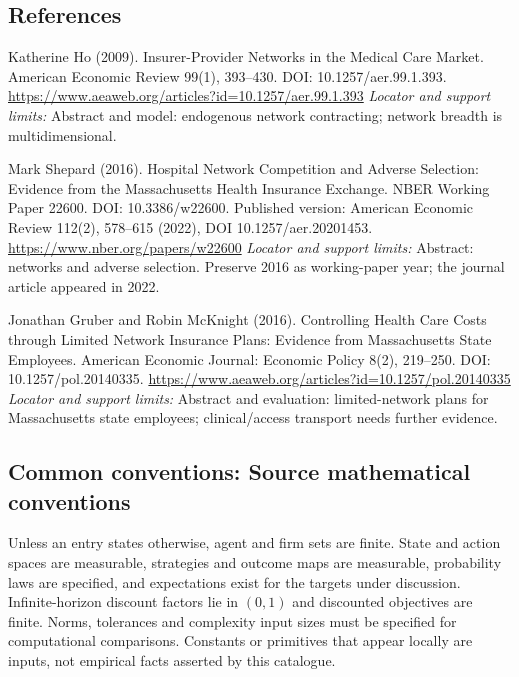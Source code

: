 \documentclass[11pt,a4paper]{article}
\begin{document}
\subsection*{References}
\begin{enumerate}[label={[S\arabic*]},leftmargin=*,itemsep=0.6em]
\item Katherine Ho (2009). Insurer-Provider Networks in the Medical Care Market. American Economic Review 99(1), 393--430. DOI: 10.1257/aer.99.1.393.
\url{https://www.aeaweb.org/articles?id=10.1257/aer.99.1.393}
\newline\emph{Locator and support limits:} Abstract and model: endogenous network contracting; network breadth is multidimensional.
\item Mark Shepard (2016). Hospital Network Competition and Adverse Selection: Evidence from the Massachusetts Health Insurance Exchange. NBER Working Paper 22600. DOI: 10.3386/w22600. Published version: American Economic Review 112(2), 578--615 (2022), DOI 10.1257/aer.20201453.
\url{https://www.nber.org/papers/w22600}
\newline\emph{Locator and support limits:} Abstract: networks and adverse selection. Preserve 2016 as working-paper year; the journal article appeared in 2022.
\item Jonathan Gruber and Robin McKnight (2016). Controlling Health Care Costs through Limited Network Insurance Plans: Evidence from Massachusetts State Employees. American Economic Journal: Economic Policy 8(2), 219--250. DOI: 10.1257/pol.20140335.
\url{https://www.aeaweb.org/articles?id=10.1257/pol.20140335}
\newline\emph{Locator and support limits:} Abstract and evaluation: limited-network plans for Massachusetts state employees; clinical/access transport needs further evidence.
\end{enumerate}

\subsection*{Common conventions: Source mathematical conventions}

Unless an entry states otherwise, agent and firm sets are finite. State and action spaces are measurable, strategies and outcome maps are measurable, probability laws are specified, and expectations exist for the targets under discussion. Infinite-horizon discount factors lie in $(0,1)$ and discounted objectives are finite. Norms, tolerances and complexity input sizes must be specified for computational comparisons. Constants or primitives that appear locally are inputs, not empirical facts asserted by this catalogue.
\end{document}
